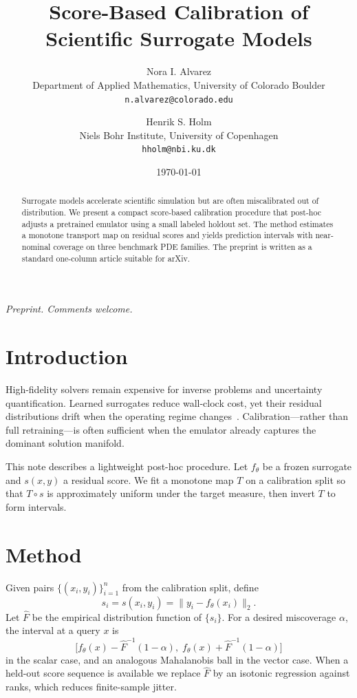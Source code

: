 \documentclass[11pt,a4paper]{article}
\title{Score-Based Calibration of Scientific Surrogate Models}
\author{
  Nora I. Alvarez\\
  Department of Applied Mathematics, University of Colorado Boulder\\
  \texttt{n.alvarez@colorado.edu}
  \and
  Henrik S. Holm\\
  Niels Bohr Institute, University of Copenhagen\\
  \texttt{hholm@nbi.ku.dk}
}
\date{\today}
\begin{document}
\maketitle

\begin{abstract}
Surrogate models accelerate scientific simulation but are often miscalibrated out of distribution. We present a compact score-based calibration procedure that post-hoc adjusts a pretrained emulator using a small labeled holdout set. The method estimates a monotone transport map on residual scores and yields prediction intervals with near-nominal coverage on three benchmark PDE families. The preprint is written as a standard one-column article suitable for arXiv.
\end{abstract}

\noindent\textit{Preprint. Comments welcome.}

\section{Introduction}

High-fidelity solvers remain expensive for inverse problems and uncertainty quantification. Learned surrogates reduce wall-clock cost, yet their residual distributions drift when the operating regime changes~\cite{raissi2019physics,karniadakis2021physics}. Calibration---rather than full retraining---is often sufficient when the emulator already captures the dominant solution manifold.

This note describes a lightweight post-hoc procedure. Let $f_\theta$ be a frozen surrogate and $s(x,y)$ a residual score. We fit a monotone map $T$ on a calibration split so that $T\circ s$ is approximately uniform under the target measure, then invert $T$ to form intervals.

\section{Method}

Given pairs $\{(x_i,y_i)\}_{i=1}^{n}$ from the calibration split, define
\begin{equation}
  s_i = s(x_i, y_i) = \|y_i - f_\theta(x_i)\|_2.
\end{equation}
Let $\hat{F}$ be the empirical distribution function of $\{s_i\}$. For a desired miscoverage $\alpha$, the interval at a query $x$ is
\begin{equation}
  \bigl[f_\theta(x) - \hat{F}^{-1}(1-\alpha),\; f_\theta(x) + \hat{F}^{-1}(1-\alpha)\bigr]
\end{equation}
in the scalar case, and an analogous Mahalanobis ball in the vector case. When a held-out score sequence is available we replace $\hat{F}$ by an isotonic regression against ranks, which reduces finite-sample jitter.
\end{document}

